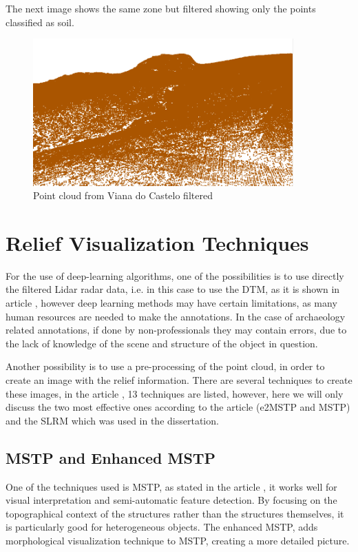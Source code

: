 The next image shows the same zone but filtered showing only the points classified as soil.
\begin{figure}[H]
\centering
\includegraphics[width=10cm]{images/pointcloudVianafiltrado.png}
\caption{Point cloud from Viana do Castelo filtered}
\end{figure}

\section{Relief Visualization Techniques}

For the use of deep-learning algorithms, one of the possibilities is to use directly the filtered Lidar radar data, i.e. in this case to use the DTM, as it is shown in article \cite{deeplearningRawLidarData}, however deep learning methods may have certain limitations, as many human resources are needed to make the annotations. In the case of archaeology related annotations, if done by non-professionals they may contain errors, due to the lack of knowledge of the scene and structure of the object in question. 

Another possibility is to use a pre-processing of the point cloud, in order to create an image with the relief information. There are several techniques to create these images, in the article \cite{reliefModel}, 13 techniques are listed, however, here we will only discuss the two most effective ones according to the article (e2MSTP and MSTP) and the SLRM which was used in the dissertation.

\subsection{MSTP and Enhanced MSTP}
One of the techniques used is MSTP, as stated in the article \cite{mstp}, it works well for visual interpretation and semi-automatic feature detection. By focusing on the topographical context of the structures rather than the structures themselves, it is particularly good for heterogeneous objects. The enhanced MSTP, adds morphological visualization technique to MSTP, creating a more detailed picture.

